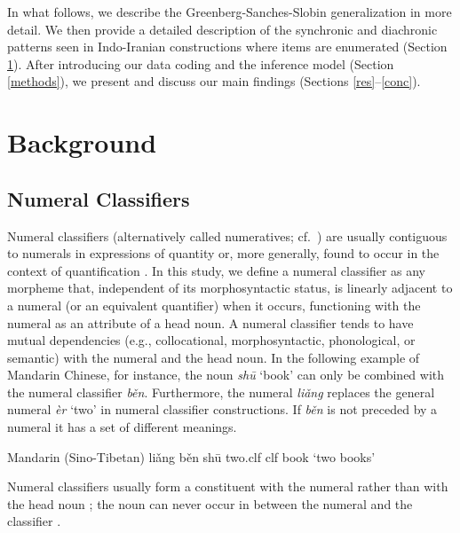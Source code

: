 \documentclass[11pt]{article}
\begin{document}
In what follows, we describe the Greenberg-Sanches-Slobin generalization in more detail. We then provide a detailed description of the synchronic and diachronic patterns seen in Indo-Iranian constructions where items are enumerated (Section \ref{background}). 
After introducing our data coding and the inference model (Section \ref{methods}), we present and discuss our main findings (Sections \ref{res}--\ref{conc}).

\section{Background}
\label{background}

\subsection{Numeral Classifiers}
Numeral classifiers (alternatively called numeratives; cf.\ \citealt[98]{Aikhenvald2000}) are usually contiguous to numerals in expressions of quantity or, more generally, found to occur in the context of quantification \citep[63]{Grinevald2000}.
In this study, we define a numeral classifier as any morpheme that, independent of its morphosyntactic status, is linearly adjacent to a numeral (or an equivalent quantifier) when it occurs, %
functioning with the numeral as an attribute of a head noun. A numeral classifier tends to have mutual dependencies (e.g., collocational, morphosyntactic, phonological, or semantic) with the numeral and the head noun. In the following example of Mandarin Chinese, for instance, the noun {\it sh\=u} `book' can only be combined with the numeral classifier {\it b\v{e}n}. Furthermore, the numeral {\it li\v{a}ng} replaces the general numeral {\it \`er} `two' in numeral classifier constructions. If {\it b\v{e}n} is not preceded by a numeral it has a set of different meanings.
\begin{example} Mandarin (Sino-Tibetan)
\gll li\v{a}ng b\v{e}n sh\=u
two.{\sc clf} {\sc clf} book
\glt `two books'
\glend
\end{example}
Numeral classifiers usually form a constituent with the numeral rather than with the head noun \citep[e.g.,][105]{Aikhenvald2000}; the noun can never occur in between the numeral and the classifier \citep{Her2017}.
\end{document}
